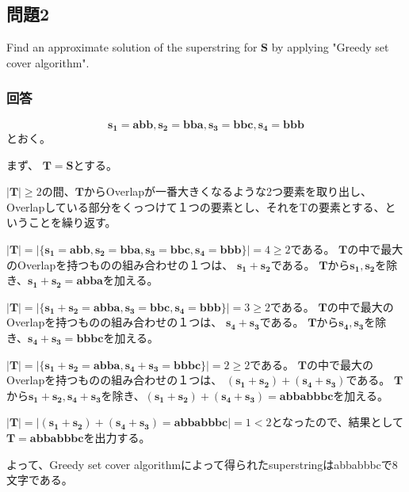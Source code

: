 \documentclass[a4j, uplatex, fleqn, dvipdfmx]{jsarticle} %
\begin{document}
\subsection{問題2}
Find an approximate solution of the superstring for $\bm{S}$
by applying "Greedy set cover algorithm".
\subsubsection{回答}
\[
  \bm{s_1} = \bm{abb}, \bm{s_2} = \bm{bba}, \bm{s_3} = \bm{bbc}, \bm{s_4} = \bm{bbb}
\]
とおく。

まず、
$\bm{T} = \bm{S}$とする。

$|\bm{T}| \geq 2$の間、$\bm{T}$からOverlapが一番大きくなるような2つ要素を取り出し、Overlapしている部分をくっつけて１つの要素とし、それをTの要素とする、ということを繰り返す。

$|\bm{T}| = |\{ \bm{s_1} = \bm{abb}, \bm{s_2} = \bm{bba}, \bm{s_3} = \bm{bbc}, \bm{s_4} = \bm{bbb} \}| = 4 \geq 2$である。
$\bm{T}$の中で最大のOverlapを持つものの組み合わせの１つは、
$\bm{s_1} + \bm{s_2}$である。
$\bm{T}$から$\bm{s_1}, \bm{s_2}$を除き、$\bm{s_1} + \bm{s_2} = \bm{abba}$を加える。

$|\bm{T}| = |\{\bm{s_1} + \bm{s_2} = \bm{abba}, \bm{s_3} = \bm{bbc}, \bm{s_4} = \bm{bbb}\}| = 3 \geq 2$である。
$\bm{T}$の中で最大のOverlapを持つものの組み合わせの１つは、
$\bm{s_4} + \bm{s_3}$である。
$\bm{T}$から$\bm{s_4}, \bm{s_3}$を除き、$\bm{s_4} + \bm{s_3} = \bm{bbbc}$を加える。

$|\bm{T}| = |\{\bm{s_1} + \bm{s_2} = \bm{abba}, \bm{s_4} + \bm{s_3} = \bm{bbbc}\}| = 2 \geq 2$である。
$\bm{T}$の中で最大のOverlapを持つものの組み合わせの１つは、
$\left(\bm{s_1} + \bm{s_2}\right) + \left(\bm{s_4} + \bm{s_3}\right)$である。
$\bm{T}$から$\bm{s_1} + \bm{s_2}, \bm{s_4} + \bm{s_3}$を除き、$\left(\bm{s_1} + \bm{s_2}\right) + \left(\bm{s_4} + \bm{s_3}\right) = \bm{abbabbbc}$を加える。

$|\bm{T}| = |\left(\bm{s_1} + \bm{s_2}\right) + \left(\bm{s_4} + \bm{s_3}\right) = \bm{abbabbbc}| = 1 < 2$となったので、結果として$\bm{T} = \bm{abbabbbc}$を出力する。

よって、Greedy set cover algorithmによって得られたsuperstringはabbabbbcで8文字である。

\end{document}
